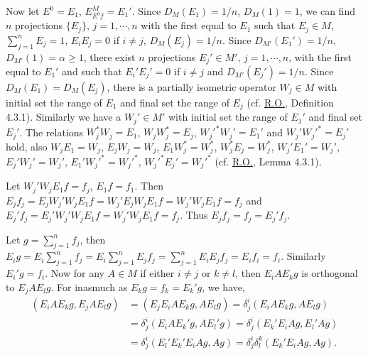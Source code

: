 \documentclass[twoside,leqno]{article}
\newcommand{\DM}{D_{M}}
\newcommand{\DMp}{D_{M'}}
\newcommand{\RO}{\href{https://doi.org/10.2307/1968693}{R.O.}}
\begin{document}
Now let $E^0=E_1$, $E_{E^0f}^{M}=E_1'$. Since $\DM(E_1)=1/n$, $\DM(1)=1$, we can find $n$
projections $\{E_j\}$, $j=1,\cdots,n$ with the first equal to $E_1$ such that $E_j\in M$,
$\sum_{j=1}^nE_j=1$, $E_iE_j=0$ if $i\ne j$, $\DM(E_j)=1/n$. Since
$\DMp(E_1')=1/n$, $\DMp(1)=\alpha\geq1$, there exist $n$ projections $E_j'\in M'$,
$j=1,\cdots,n$, with the first equal to $E_1'$ and such that $E_i'E_j'=0$ if $i\ne j$ and
$\DMp(E_j')=1/n$. Since $\DM(E_1)=\DM(E_j)$, there is a partially isometric
operator $W_j\in M$ with initial set the range of $E_1$ and final set the range of
$E_j$ (cf. \RO{}, Definition 4.3.1). Similarly we have a $W_j'\in M'$ with initial
set the range of $E_1'$ and final set $E_j'$. The relations
$W_j^*W_j=E_1$, $W_jW_j^*=E_j$, $W_j'^*W_j'=E_1'$ and
$W_j'W_j'^*=E_j'$ hold, also $W_jE_1=W_j$, $E_jW_j=W_j$,
$E_1W_j^*=W_j^*$, $W_j^*E_j=W_j^*$, $W_j'E_1'=W_j'$,
$E_j'W_j'=W_j'$, $E_1'W_j'^*=W_j'^*$, $W_j'^*E_j'=W_j'^*$
(cf. \RO{}, Lemma 4.3.1).

Let $W_j'W_jE_1f=f_j$, $E_1f=f_1$. Then
$E_jf_j=E_jW_j'W_jE_1f=W_j'E_jW_jE_1f=W_j'W_jE_1f=f_j$ and
$E_j'f_j=E_j'W_j'W_jE_1f=W_j'W_jE_1f=f_j$. Thus
$E_jf_j=f_j=E_j'f_j$.

Let $g=\sum_{j=1}^nf_j$, then
$E_ig=E_i\sum_{j=1}^nf_j=E_i\sum_{j=1}^nE_jf_j
=\sum_{j=1}^nE_iE_jf_j=E_if_i=f_i$.
Similarly $E_i'g=f_i$. Now for any $A\in M$ if either $i\ne j$ or $k\ne l$, then
$E_iAE_kg$ is orthogonal to $E_jAE_lg$. For inasmuch as $E_kg=f_k=E_k'g$, we have,
\begin{align*}
 (E_iAE_kg,E_jAE_lg)
  &=(E_jE_iAE_kg,AE_lg)
    =\delta_j^i(E_iAE_kg,AE_lg)\\
  &=\delta_j^i(E_iAE_k'g,AE_l'g)
    =\delta_j^i(E_k'E_iAg,E_l'Ag)\\
  &=\delta_j^i(E_l'E_k'E_iAg,Ag)
    =\delta_j^i\delta_l^k(E_k'E_iAg,Ag).
\end{align*}
\end{document}
